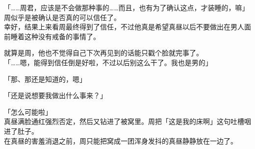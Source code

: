 「……周君，应该是不会做那种事的……而且，也有为了确认这点，才装睡的，嘛」\\

周似乎是被确认是否真的可以信任了。\\

幸好，结果上来看周最终得到了信任，不过他真是希望真昼以后不要做出在男人面前睡着这种没有戒备的事情了。

就算是周，他也不觉得自己下次再见到的话能只戳个脸就完事了。\\

「……嗯，能得到信任倒是好啦，不过以后别这么干了。我也是男的」

「那、那还是知道的，嗯」

「还是说想要我做出什么事来？」

「怎么可能啦」\\

真昼满脸通红强烈否定，然后又钻进了被窝里。周把「这是我的床啊」这句吐槽咽进了肚子。\\

在真昼的害羞消退之前，周只能把窝成一团浑身发抖的真昼静静放在一边了。
